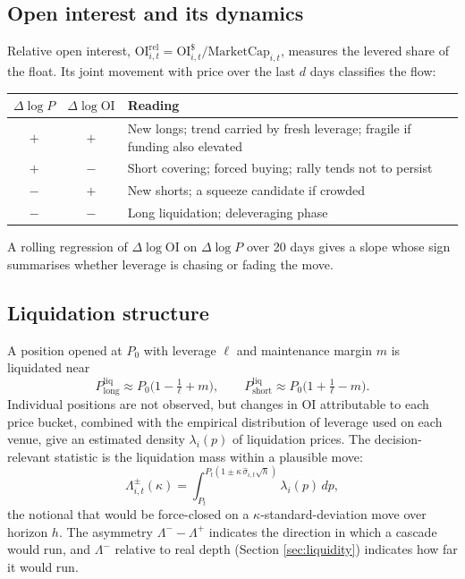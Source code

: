 \documentclass[11pt,a4paper]{article}
\theoremstyle{definition}
\begin{document}
\subsection{Open interest and its dynamics}

Relative open interest, $\mathrm{OI}^{\mathrm{rel}}_{i,t} = \mathrm{OI}^{\$}_{i,t}/\mathrm{MarketCap}_{i,t}$, measures the levered share of the float. Its joint movement with price over the last $d$ days classifies the flow:
\begin{center}
\small
\begin{tabular}{cc p{}}
\toprule
$\Delta \log P$ & $\Delta \log \mathrm{OI}$ & Reading \\
\midrule
$+$ & $+$ & New longs; trend carried by fresh leverage; fragile if funding also elevated \\
$+$ & $-$ & Short covering; forced buying; rally tends not to persist \\
$-$ & $+$ & New shorts; a squeeze candidate if crowded \\
$-$ & $-$ & Long liquidation; deleveraging phase \\
\bottomrule
\end{tabular}
\end{center}
A rolling regression of $\Delta\log\mathrm{OI}$ on $\Delta\log P$ over 20 days gives a slope whose sign summarises whether leverage is chasing or fading the move.

\subsection{Liquidation structure}

A position opened at $P_0$ with leverage $\ell$ and maintenance margin $m$ is liquidated near
\begin{equation}
P^{\mathrm{liq}}_{\mathrm{long}} \approx P_0\Big(1 - \tfrac{1}{\ell} + m\Big), \qquad P^{\mathrm{liq}}_{\mathrm{short}} \approx P_0\Big(1 + \tfrac{1}{\ell} - m\Big).
\end{equation}
Individual positions are not observed, but changes in OI attributable to each price bucket, combined with the empirical distribution of leverage used on each venue, give an estimated density $\lambda_i(p)$ of liquidation prices. The decision-relevant statistic is the liquidation mass within a plausible move:
\begin{equation}
\Lambda^{\pm}_{i,t}(\kappa) = \int_{P_t}^{P_t(1 \pm \kappa\,\hat\sigma_{i,t}\sqrt{h})} \lambda_i(p)\,dp,
\end{equation}
the notional that would be force-closed on a $\kappa$-standard-deviation move over horizon $h$. The asymmetry $\Lambda^{-} - \Lambda^{+}$ indicates the direction in which a cascade would run, and $\Lambda^{-}$ relative to real depth (Section \ref{sec:liquidity}) indicates how far it would run.
\end{document}
